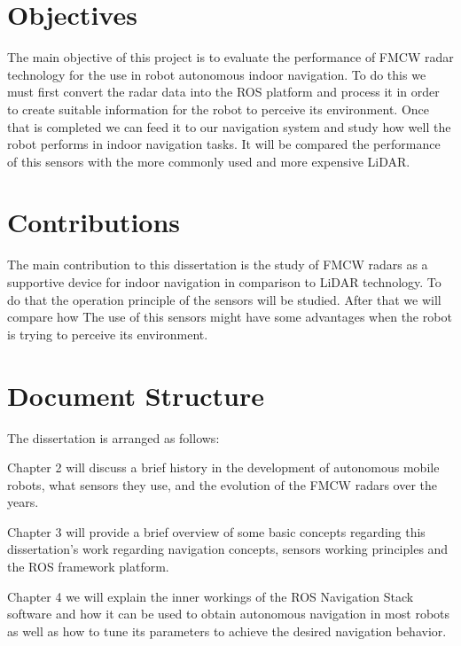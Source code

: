 \section{Objectives}
The main objective of this project is to evaluate the performance of \ac{FMCW} radar technology for the use in robot autonomous indoor navigation. To do this we must first convert the radar data into the \ac{ROS} platform and process it in order to create suitable information for the robot to perceive its environment. Once that is completed we can feed it to our navigation system and study how well the robot performs in indoor navigation tasks.
It will be compared the performance of this sensors with the more commonly used and more expensive \ac{LiDAR}.

\section{Contributions}
The main contribution to this dissertation is the study of \ac{FMCW} radars as a supportive device for indoor navigation in comparison to \ac{LiDAR} technology.
To do that the operation principle of the sensors will be studied.
After that we will compare how
The use of this sensors might have some advantages when the robot is trying to  perceive its environment.

\section{Document Structure}
The dissertation is arranged as follows:

Chapter 2 will discuss a brief history in the development of autonomous mobile robots, what sensors they use, and the evolution of the \ac{FMCW} radars over the years.

Chapter 3 will provide a brief overview of some basic concepts regarding this dissertation's work regarding navigation concepts, sensors working principles and the ROS framework platform.

Chapter 4 we will explain the inner workings of the ROS Navigation Stack software and how it can be used to obtain autonomous navigation in most robots as well as how to tune its parameters to achieve the desired navigation behavior.




